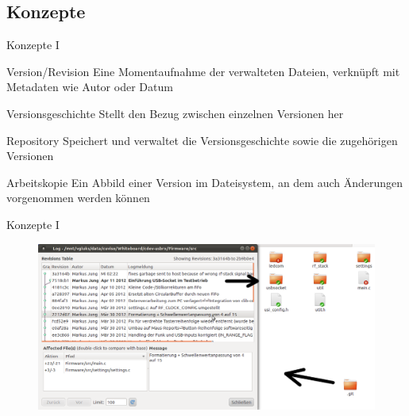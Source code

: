 \documentclass[18pt]{beamer}
\begin{document}
\subsection{Konzepte}
\begin{frame}{Konzepte I}
	\begin{block}{Version/Revision}
		Eine Momentaufnahme der verwalteten Dateien, verknüpft mit Metadaten wie Autor oder Datum
	\end{block}
	\begin{block}{Versionsgeschichte}
		Stellt den Bezug zwischen einzelnen Versionen her
	\end{block}
	\begin{block}{Repository}
		Speichert und verwaltet die Versionsgeschichte sowie die zugehörigen Versionen
	\end{block}
	\begin{block}{Arbeitskopie}
		Ein Abbild einer Version im Dateisystem, an dem auch Änderungen vorgenommen werden können
	\end{block}
\end{frame}
\begin{frame}{Konzepte I}
	\begin{figure}
		\includegraphics[width=\linewidth]{images/history.png}
	\end{figure}
\end{frame}
\end{document}
